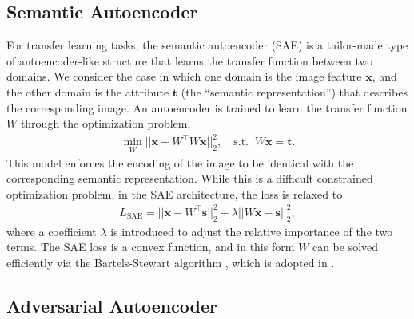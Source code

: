 \documentclass{article}
\newcommand{\bb}[1]{\boldsymbol{#1}}
\begin{document}
\subsection{Semantic Autoencoder}

For transfer learning tasks, the semantic autoencoder (SAE) \cite{kodirov2017semantic} is a tailor-made type of antoencoder-like structure that learns the transfer function between two domains. We consider the case in which one domain is the image feature $\bb{x}$, and the other domain is the attribute $\bb{t}$ (the ``semantic representation'') that describes the corresponding image. An autoencoder is trained to learn the transfer function $W$ through the optimization problem,
	\begin{align}
	\min_{W} || \bb{x} - W^{\top} W \bb{x} ||_2^2, \quad \text{s.t.} \;\; W \bb{x} = \bb{t}.
	\end{align}
	This model enforces the encoding of the image to be identical with the corresponding semantic representation. While this is a difficult constrained optimization problem, in the SAE architecture, the loss is relaxed to
	\begin{align}
	\label{eq:SAELoss} L_{\textrm{SAE}} = || \bb{x} - W^{\top} \bb{s}||_2^2 + \lambda || W \bb{x} - \bb{s} ||_2^2,
	\end{align}
	where a coefficient $\lambda$ is introduced to adjust the relative importance of the two terms. The SAE loss is a convex function, and in this form $W$ can be solved efficiently via the Bartels-Stewart algorithm \cite{lu1971solution}, which is adopted in \cite{kodirov2017semantic}.




\subsection{Adversarial Autoencoder}
\end{document}

